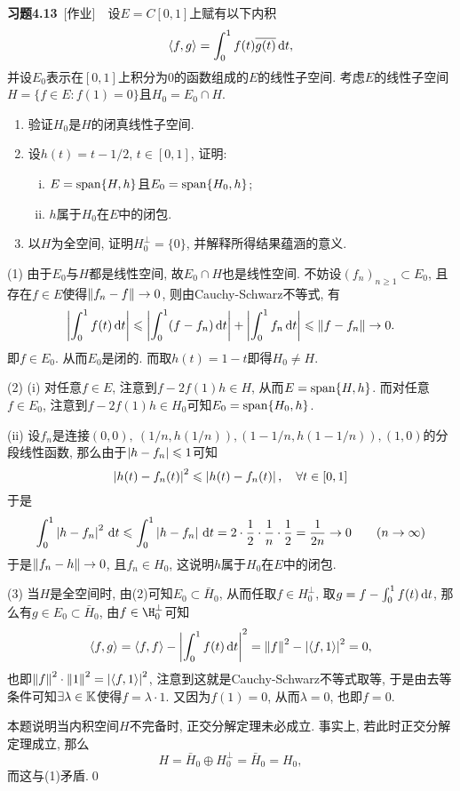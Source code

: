 	\textbf{习题4.13}\ [作业]\ \ 设$ E=C[0,1] $上赋有以下内积
	\[
	\left\langle f,g \right\rangle=\int_0^1f(t)\overline{g(t)}\,\mathrm{d} t,
	\]
	并设$ E_0 $表示在$ [0,1] $上积分为0的函数组成的$ E $的线性子空间. 考虑$ E $的线性子空间$ H=\{ f\in E : f(1)=0 \} $且$ H_0=E_0\cap H $.
	\begin{enumerate}[(1)]
	\item 验证$ H_0 $是$ H $的闭真线性子空间.
	\item 设$ h(t)=t-1/2 $, $ t\in[0,1] $, 证明:
	\begin{enumerate}[(i)]
	\item $ E=\operatorname{span}\{H,h\} $且$ E_0=\operatorname{span}\{H_0,h\} $;
	\item $ h $属于$ H_0 $在$ E $中的闭包.
	\end{enumerate}
	\item 以$ H $为全空间, 证明$ H_0^\bot=\{0\} $, 并解释所得结果蕴涵的意义.
	\end{enumerate}
	\begin{Proof}
	(1) 由于$ E_0 $与$ H $都是线性空间, 故$ E_0\cap H $也是线性空间. 不妨设$ (f_n)_{n\geqslant 1}\subset E_0 $, 且存在$ f\in E $使得$ \left\| f_n-f \right\|\to 0 $, 则由Cauchy-Schwarz不等式, 有
	\[
	\left| \int_0^1f(t)\,\mathrm{d} t \right| \leqslant\left| \int_0^1(f-f_n)\,\mathrm{d} t \right| +\left| \int_0^1f_n\,\mathrm{d} t \right| \leqslant\left\| f-f_n \right\|\to 0.
	\]
	即$ f\in E_0 $. 从而$ E_0 $是闭的. 而取$ h(t)=1-t $即得$ H_0\ne H $.
	
	(2) (i) 对任意$ f\in E $, 注意到$ f-2f(1)h\in H $, 从而$ E=\operatorname{span}\{ H,h \} $. 而对任意$ f\in E_0 $, 注意到$ f-2f(1)h\in H_0 $可知$ E_0=\operatorname{span}\{ H_0,h \} $.
	
	(ii) 设$ f_n $是连接$ (0,0),\ (1/n,h(1/n)), (1-1/n,h(1-1/n)), (1,0) $的分段线性函数, 那么由于$ \left| h-f_n \right| \leqslant 1 $可知
	\[
	\left| h(t)-f_n(t) \right| ^2\leqslant\left| h(t)-f_n(t) \right| ,\quad\forall t\in [0,1]
	\]
	于是
	\[
	\int_0^1\left| h-f_n \right| ^2\,\mathrm{d} t\leqslant\int_0^1\left| h-f_n \right| \,\mathrm{d} t=2\cdot\frac{1}{2}\cdot\frac{1}{n}\cdot\frac{1}{2}=\frac{1}{2n}\to 0\qquad (n\to\infty)
	\]
	于是$ \left\| f_n-h \right\|\to 0 $, 且$ f_n\in H_0 $, 这说明$ h $属于$ H_0 $在$ E $中的闭包.
	
	(3) 当$ H $是全空间时, 由(2)可知$ E_0\subset\bar{H}_0 $, 从而任取$ f\in H_0^\bot $, 取$ g=f-\int_0^1f(t)\,\mathrm{d} t $, 那么有$ g\in E_0\subset \bar{H}_0 $, 由$ f\in\H_0^\bot $可知
	\[
	\left\langle f,g \right\rangle=\left\langle f,f \right\rangle-\left| \int_0^1f(t)\,\mathrm{d} t \right| ^2=\left\| f \right\|^2-\left| \left\langle f,1 \right\rangle \right| ^2=0,
	\]
	也即$ \left\| f \right\|^2\cdot\left\| 1 \right\|^2=\left| \left\langle f,1 \right\rangle \right| ^2 $, 注意到这就是Cauchy-Schwarz不等式取等, 于是由去等条件可知$ \exists\lambda\in\mathbb{K} $使得$ f=\lambda\cdot 1 $. 又因为$ f(1)=0 $, 从而$ \lambda=0 $, 也即$ f=0 $.
	
	本题说明当内积空间$ H $不完备时, 正交分解定理未必成立. 事实上, 若此时正交分解定理成立, 那么
	\[
	H=\bar{H}_0\oplus H_0^\bot=\bar{H}_0=H_0,
	\]
	而这与(1)矛盾.\qed
	\end{Proof}
	
